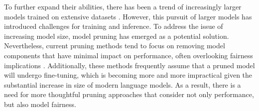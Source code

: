 \documentclass[letterpaper]{article} %
\newcommand{\goncalo}[1]
{\textcolor{orange}{{\bf}{\em #1}{\bf}}}
\begin{document}
To further expand their abilities, there has been a trend of increasingly larger models trained on extensive datasets \cite{smith2022using,brown2020language,cohen2022lamda,rae2021scaling,lieber2021jurassic,hoffmann2022training}. However, this pursuit of larger models has introduced challenges for training and inference. To address the issue of increasing model size, model pruning has emerged as a potential solution. Nevertheless, current pruning methods tend to focus on removing model components that have minimal impact on performance, often overlooking fairness implications \cite{Fan2020Reducing,voita-etal-2019-analyzing,fan-etal-2021-layer,behnke-heafield-2021-pruning,prasanna-etal-2020-bert,voita-etal-2019-analyzing}. Additionally, these methods frequently assume that a pruned model will undergo fine-tuning, which is becoming more and more impractical given the substantial increase in size of
modern language models. As a result, there is a need for more thoughtful pruning approaches that consider not only performance, but also model fairness.%
\end{document}
